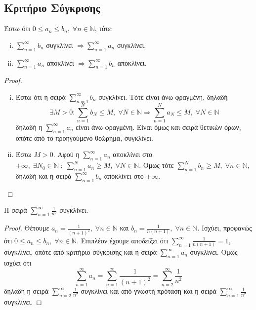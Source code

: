 \documentclass[main.tex]{subfiles}
\begin{document}
\subsection{Κριτήριο Σύγκρισης}
Έστω ότι $ 0 \leq a_{n} \leq b_{n}, \; \forall n \in \mathbb{N} $, τότε:
\begin{enumerate}[i)]
    \item $ \sum_{n=1}^{\infty} b_{n} $ συγκλίνει $ \Rightarrow \sum_{n=1}^{\infty} 
        a_{n}$ συγκλίνει.
    \item $ \sum_{n=1}^{\infty} a_{n} $ αποκλίνει $ \Rightarrow \sum_{n=1}^{\infty} 
        b_{n} $ αποκλίνει.
\end{enumerate}
\begin{proof}
\item {}
    \begin{enumerate}[i)]
        \item Έστω ότι η σειρά $ \sum_{n=1}^{\infty} b_{n} $ συγκλίνει. Τότε είναι 
            άνω φραγμένη, δηλαδή 
            \[
                \exists M>0 : \sum_{n=1}^{N} b_{N} \leq M, \; \forall N \in \mathbb{N}
                \Rightarrow \sum_{n=1}^{N} a_{N} \leq M, \; \forall N \in \mathbb{N}
            \]
            δηλαδή η $ \sum_{n=1}^{\infty} a_{n} $ είναι άνω φραγμένη. Είναι όμως και 
            σειρά θετικών όρων, οπότε από το προηγούμενο θεώρημα, συγκλίνει.

        \item Έστω $ M >0 $. Αφού η $ \sum_{n=1}^{\infty} a_{n} $ αποκλίνει στο $ 
            + \infty, \; \exists N_{0} \in \mathbb{N} \; : \; \sum_{n=1}^{N} a_{n} 
            \geq M, \; \forall N \in \mathbb{N} $. 
            Όμως τότε $ \sum_{n=1}^{N} b_{n} \geq M, \; \forall n \in \mathbb{N} $, 
            δηλαδή και η σειρά $ \sum_{n=1}^{\infty} b_{n} $ αποκλίνει στο $ 
            + \infty$.
    \end{enumerate}
\end{proof}

\begin{prop}
    Η σειρά $ \sum_{n=1}^{\infty} \frac{1}{n^{2}} $ συγκλίνει.
\end{prop}
\begin{proof}
\item {}
    Θέτουμε $ a_{n} = \frac{1}{(n+1)^{2}}, \; \forall n \in \mathbb{N} $ και 
    $ b_{n} = \frac{1}{n(n+1)}, \; \forall n \in \mathbb{N} $. Ισχύει, προφανώς ότι
    $ 0 \leq a_{n} \leq b_{n}, \; \forall n \in \mathbb{N} $. Επιπλέον έχουμε αποδείξει
    ότι $ \sum_{n=1}^{\infty} \frac{1}{n(n+1)} = 1 $, συγκλίνει, οπότε από κριτήριο 
    σύγκρισης και η σειρά 
    $ \sum_{n=1}^{\infty} a_{n} $ συγκλίνει. Όμως ισχύει ότι
    \[
        \sum_{n=1}^{\infty} a_{n} = \sum_{n=1}^{\infty} \frac{1}{(n+1)^{2}} = 
        \sum_{n=2}^{\infty} \frac{1}{n^{2}} 
     \] 
     δηλαδή η σειρά $ \sum_{n=2}^{\infty} \frac{1}{n^{2}} $ συγκλίνει και από γνωστή 
     πρόταση και η σειρά $ \sum_{n=1}^{\infty} \frac{1}{n^{2}} $ συγκλίνει.
\end{proof}
\end{document}
